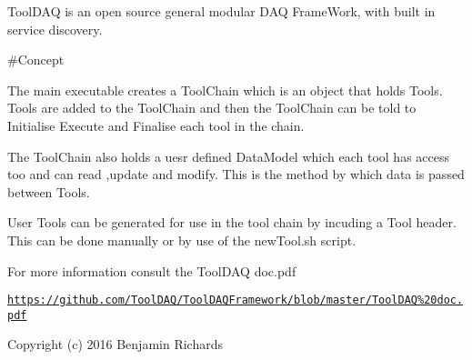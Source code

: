 Tool\-D\-A\-Q is an open source general modular D\-A\-Q Frame\-Work, with built in service discovery.



 \#\-Concept 



The main executable creates a Tool\-Chain which is an object that holds Tools. Tools are added to the Tool\-Chain and then the Tool\-Chain can be told to Initialise Execute and Finalise each tool in the chain.

The Tool\-Chain also holds a uesr defined Data\-Model which each tool has access too and can read ,update and modify. This is the method by which data is passed between Tools.

User Tools can be generated for use in the tool chain by incuding a Tool header. This can be done manually or by use of the new\-Tool.\-sh script.

For more information consult the Tool\-D\-A\-Q doc.\-pdf

\href{https://github.com/ToolDAQ/ToolDAQFramework/blob/master/ToolDAQ%20doc.pdf}{\tt https\-://github.\-com/\-Tool\-D\-A\-Q/\-Tool\-D\-A\-Q\-Framework/blob/master/\-Tool\-D\-A\-Q\%20doc.\-pdf}

Copyright (c) 2016 Benjamin Richards 